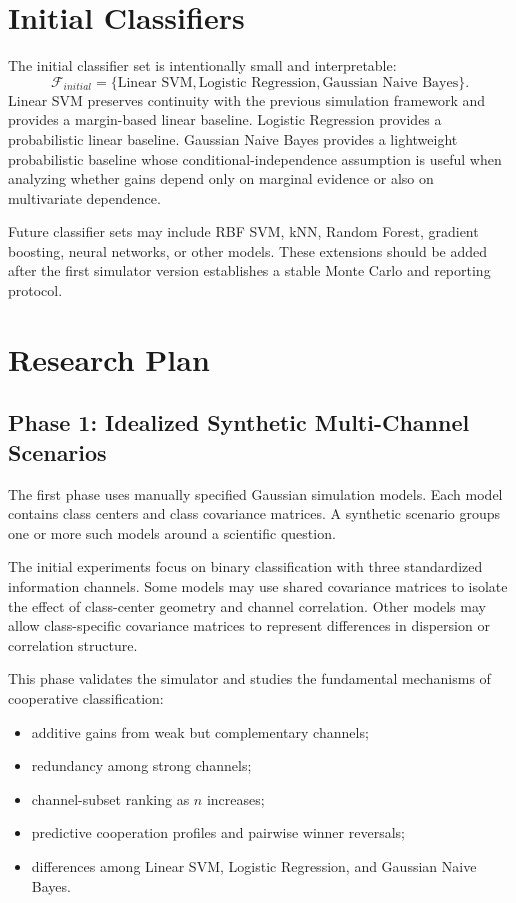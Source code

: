 \documentclass[11pt,a4paper]{article}
\begin{document}
\section{Initial Classifiers}

The initial classifier set is intentionally small and interpretable:
\[
    \mathcal{F}_{initial}=\{\text{Linear SVM},\text{Logistic Regression},\text{Gaussian Naive Bayes}\}.
\]
Linear SVM preserves continuity with the previous simulation framework and provides a margin-based linear baseline. Logistic Regression provides a probabilistic linear baseline. Gaussian Naive Bayes provides a lightweight probabilistic baseline whose conditional-independence assumption is useful when analyzing whether gains depend only on marginal evidence or also on multivariate dependence.

Future classifier sets may include RBF SVM, kNN, Random Forest, gradient boosting, neural networks, or other models. These extensions should be added after the first simulator version establishes a stable Monte Carlo and reporting protocol.

\section{Research Plan}

\subsection{Phase 1: Idealized Synthetic Multi-Channel Scenarios}

The first phase uses manually specified Gaussian simulation models. Each model contains class centers and class covariance matrices. A synthetic scenario groups one or more such models around a scientific question.

The initial experiments focus on binary classification with three standardized information channels. Some models may use shared covariance matrices to isolate the effect of class-center geometry and channel correlation. Other models may allow class-specific covariance matrices to represent differences in dispersion or correlation structure.

This phase validates the simulator and studies the fundamental mechanisms of cooperative classification:
\begin{itemize}
    \item additive gains from weak but complementary channels;
    \item redundancy among strong channels;
    \item channel-subset ranking as $n$ increases;
    \item predictive cooperation profiles and pairwise winner reversals;
    \item differences among Linear SVM, Logistic Regression, and Gaussian Naive Bayes.
\end{itemize}
\end{document}
